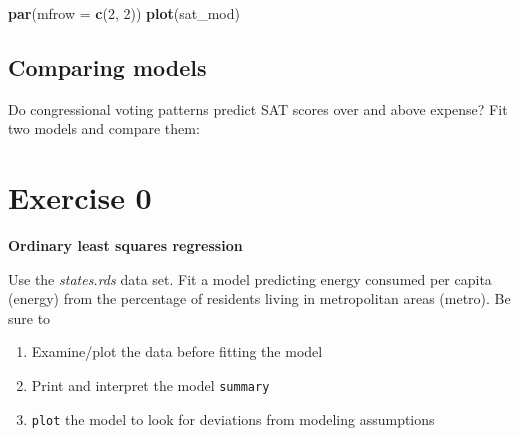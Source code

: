 \documentclass[]{book}
\newenvironment{Shaded}{\begin{snugshade}}{\end{snugshade}}
\newcommand{\KeywordTok}[1]{\textcolor[rgb]{0.13,0.29,0.53}{\textbf{#1}}}
\newcommand{\DataTypeTok}[1]{\textcolor[rgb]{0.13,0.29,0.53}{#1}}
\newcommand{\DecValTok}[1]{\textcolor[rgb]{0.00,0.00,0.81}{#1}}
\newcommand{\StringTok}[1]{\textcolor[rgb]{0.31,0.60,0.02}{#1}}
\newcommand{\CommentTok}[1]{\textcolor[rgb]{0.56,0.35,0.01}{\textit{#1}}}
\newcommand{\OperatorTok}[1]{\textcolor[rgb]{0.81,0.36,0.00}{\textbf{#1}}}
\newcommand{\NormalTok}[1]{#1}
\providecommand{\tightlist}{%
  \setlength{\itemsep}{0pt}\setlength{\parskip}{0pt}}
\begin{document}
\begin{Shaded}
\begin{Highlighting}[]
  \KeywordTok{par}\NormalTok{(}\DataTypeTok{mfrow =} \KeywordTok{c}\NormalTok{(}\DecValTok{2}\NormalTok{, }\DecValTok{2}\NormalTok{)) }
  \KeywordTok{plot}\NormalTok{(sat_mod)}
\end{Highlighting}
\end{Shaded}

\subsection{Comparing models}\label{comparing-models}

Do congressional voting patterns predict SAT scores over and above
expense? Fit two models and compare them:

\begin{Shaded}
\end{Shaded}

\section{Exercise 0}\label{exercise-0-1}

\textbf{Ordinary least squares regression}

Use the \emph{states.rds} data set. Fit a model predicting energy
consumed per capita (energy) from the percentage of residents living in
metropolitan areas (metro). Be sure to

\begin{enumerate}
\def\labelenumi{\arabic{enumi}.}
\tightlist
\item
  Examine/plot the data before fitting the model
\item
  Print and interpret the model \texttt{summary}
\item
  \texttt{plot} the model to look for deviations from modeling
  assumptions
\end{enumerate}
\end{document}
